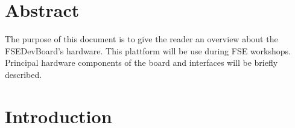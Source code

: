 \documentclass[
10pt, %
a4paper, %
oneside, %
headinclude,footinclude, %
BCOR=5mm, %
table,
]{scrartcl}
\begin{document}
\section*{Abstract} %
The purpose of this document is to give the reader an overview about the FSEDevBoard's hardware. This plattform will be use during FSE workshops. Principal hardware components of the board and interfaces will be briefly described.

%
\newpage
%


\section{Introduction}
\end{document}
